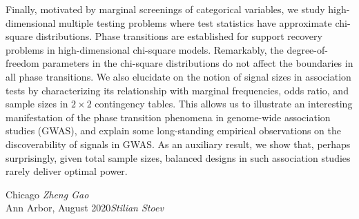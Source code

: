 Finally, motivated by marginal screenings of categorical variables, we study high-dimensional multiple testing problems where test statistics have approximate chi-square distributions.
Phase transitions are established for support recovery problems in high-dimensional chi-square models.
Remarkably, the degree-of-freedom parameters in the chi-square distributions do not affect the boundaries in all phase transitions.
We also elucidate on the notion of signal sizes in association tests by characterizing its relationship with marginal frequencies, odds ratio, and sample sizes in $2\times2$ contingency tables. 
This allows us to illustrate an interesting manifestation of the phase transition phenomena in %
genome-wide association studies (GWAS), 
and explain some long-standing empirical observations on the discoverability of signals in GWAS.
As an auxiliary result, we show that, perhaps surprisingly, given total sample sizes, balanced designs in such association studies rarely deliver optimal power. 


\vspace{\baselineskip}
\begin{flushright}\noindent
Chicago \hfill {\it Zheng Gao }\\
Ann Arbor, August 2020\hfill {\it Stilian Stoev}\\
\end{flushright}


